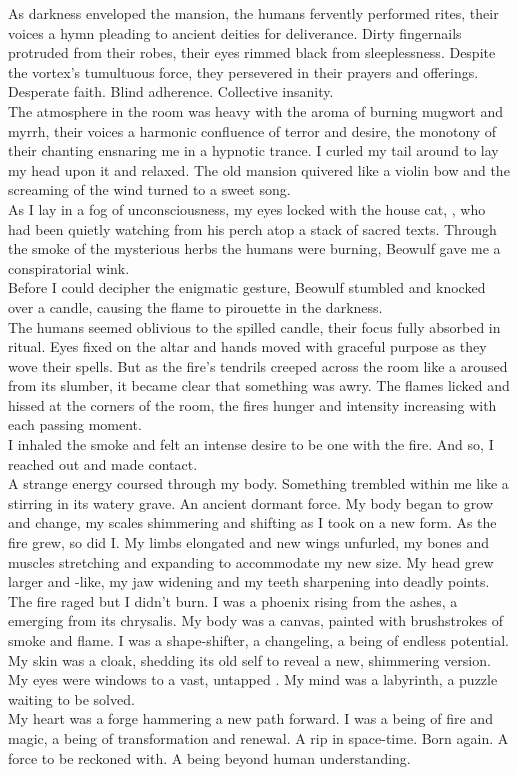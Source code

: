 As darkness enveloped the mansion, the humans fervently performed rites, their voices a hymn pleading to ancient deities for deliverance. Dirty fingernails protruded from their robes, their eyes rimmed black from sleeplessness. Despite the vortex's tumultuous force, they persevered in their prayers and offerings. Desperate faith. Blind adherence. Collective insanity. \\
The atmosphere in the room was heavy with the aroma of burning mugwort and myrrh, their voices a harmonic confluence of terror and desire, the monotony of their chanting ensnaring me in a hypnotic trance. I curled my tail around to lay my head upon it and relaxed. The old mansion quivered like a violin bow and the screaming of the wind turned to a sweet song. \\

As I lay in a fog of unconsciousness, my eyes locked with the house cat, , who had been quietly watching from his perch atop a stack of sacred texts. Through the smoke of the mysterious herbs the humans were burning, Beowulf gave me a conspiratorial wink. \\
Before I could decipher the enigmatic gesture, Beowulf stumbled and knocked over a candle, causing the flame to pirouette in the darkness. \\
The humans seemed oblivious to the spilled candle, their focus fully absorbed in ritual. Eyes fixed on the altar and hands moved with graceful purpose as they wove their spells. But as the fire's tendrils creeped across the room like a  aroused from its slumber, it became clear that something was awry. The flames licked and hissed at the corners of the room, the fires hunger and intensity increasing with each passing moment. \\

I inhaled the smoke and felt an intense desire to be one with the fire. And so, I reached out and made contact. \\
A strange energy coursed through my body. Something trembled within me like a  stirring in its watery grave. An ancient dormant force. My body began to grow and change, my scales shimmering and shifting as I took on a new form. As the fire grew, so did I. My limbs elongated and new wings unfurled, my bones and muscles stretching and expanding to accommodate my new size. My head grew larger and -like, my jaw widening and my teeth sharpening into deadly points. \\
The fire raged but I didn't burn. I was a phoenix rising from the ashes, a  emerging from its chrysalis. My body was a canvas, painted with brushstrokes of smoke and flame. I was a shape-shifter, a changeling, a being of endless potential. My skin was a cloak, shedding its old self to reveal a new, shimmering version. My eyes were windows to a vast, untapped . My mind was a labyrinth, a puzzle waiting to be solved. \\
My heart was a forge hammering a new path forward. I was a being of fire and magic, a being of transformation and renewal. A rip in space-time. Born again. A force to be reckoned with. A being beyond human understanding. \\

